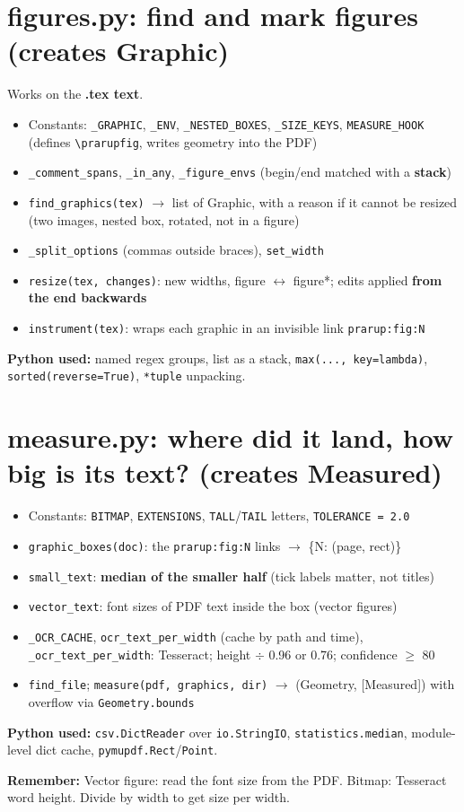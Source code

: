 \documentclass[10.5pt,a4paper]{article}
\newcommand{\cc}[1]{\texttt{#1}}
\newcommand{\remember}[1]{\par\smallskip\noindent\colorbox{soft}{\parbox{\dimexpr\linewidth-2\fboxsep}{\textbf{\color{slate}Remember:} #1}}\par\smallskip}
\begin{document}
\section{figures.py: find and mark figures (creates Graphic)}
Works on the \textbf{.tex text}.
\begin{itemize}
\item Constants: \cc{\_GRAPHIC}, \cc{\_ENV}, \cc{\_NESTED\_BOXES}, \cc{\_SIZE\_KEYS}, \cc{MEASURE\_HOOK} (defines \cc{\textbackslash prarupfig}, writes geometry into the PDF)
\item \cc{\_comment\_spans}, \cc{\_in\_any}, \cc{\_figure\_envs} (begin/end matched with a \textbf{stack})
\item \cc{find\_graphics(tex)} \(\rightarrow\) list of Graphic, with a reason if it cannot be resized (two images, nested box, rotated, not in a figure)
\item \cc{\_split\_options} (commas outside braces), \cc{set\_width}
\item \cc{resize(tex, changes)}: new widths, figure \(\leftrightarrow\) figure*; edits applied \textbf{from the end backwards}
\item \cc{instrument(tex)}: wraps each graphic in an invisible link \cc{prarup:fig:N}
\end{itemize}
\textbf{Python used:} named regex groups, list as a stack, \cc{max(..., key=lambda)}, \cc{sorted(reverse=True)}, \cc{*tuple} unpacking.

\section{measure.py: where did it land, how big is its text? (creates Measured)}
\begin{itemize}
\item Constants: \cc{BITMAP}, \cc{EXTENSIONS}, \cc{TALL}/\cc{TAIL} letters, \cc{TOLERANCE = 2.0}
\item \cc{graphic\_boxes(doc)}: the \cc{prarup:fig:N} links \(\rightarrow\) \{N: (page, rect)\}
\item \cc{small\_text}: \textbf{median of the smaller half} (tick labels matter, not titles)
\item \cc{vector\_text}: font sizes of PDF text inside the box (vector figures)
\item \cc{\_OCR\_CACHE}, \cc{ocr\_text\_per\_width} (cache by path and time), \cc{\_ocr\_text\_per\_width}: Tesseract; height \(\div\) 0.96 or 0.76; confidence \(\geq\) 80
\item \cc{find\_file}; \cc{measure(pdf, graphics, dir)} \(\rightarrow\) (Geometry, [Measured]) with overflow via \cc{Geometry.bounds}
\end{itemize}
\textbf{Python used:} \cc{csv.DictReader} over \cc{io.StringIO}, \cc{statistics.median}, module-level dict cache, \cc{pymupdf.Rect}/\cc{Point}.
\remember{Vector figure: read the font size from the PDF. Bitmap: Tesseract word height. Divide by width to get size per width.}
\end{document}
